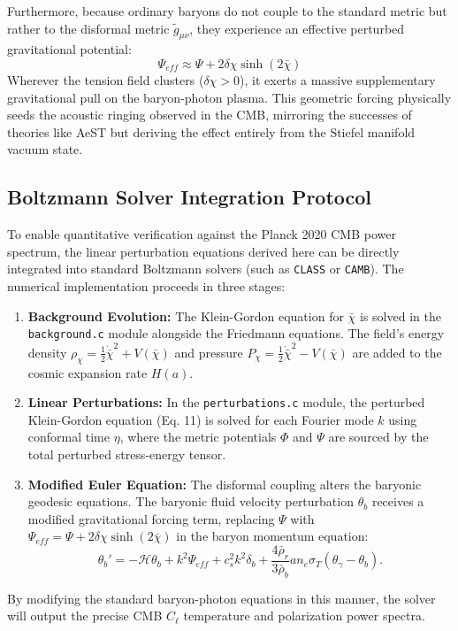 \documentclass[twocolumn,amsmath,amssymb,floatfix]{article}
\newcommand{\tmunu}{\tilde{g}_{\mu\nu}}
\begin{document}
Furthermore, because ordinary baryons do not couple to the standard metric but rather to the disformal metric $\tmunu$, they experience an effective perturbed gravitational potential:
\begin{equation}
    \Psi_{eff} \approx \Psi + 2\delta\chi \sinh(2\bar{\chi})
\end{equation}
Wherever the tension field clusters ($\delta\chi > 0$), it exerts a massive supplementary gravitational pull on the baryon-photon plasma. This geometric forcing physically seeds the acoustic ringing observed in the CMB, mirroring the successes of theories like AeST \citep{Skordis2021} but deriving the effect entirely from the Stiefel manifold vacuum state.

\subsection{Boltzmann Solver Integration Protocol}

To enable quantitative verification against the Planck 2020 CMB power spectrum, the linear perturbation equations derived here can be directly integrated into standard Boltzmann solvers (such as \texttt{CLASS} or \texttt{CAMB}). The numerical implementation proceeds in three stages:
\begin{enumerate}
    \item \textbf{Background Evolution:} The Klein-Gordon equation for $\bar{\chi}$ is solved in the \texttt{background.c} module alongside the Friedmann equations. The field's energy density $\rho_\chi = \frac{1}{2} \dot{\bar{\chi}}^2 + V(\bar{\chi})$ and pressure $P_\chi = \frac{1}{2} \dot{\bar{\chi}}^2 - V(\bar{\chi})$ are added to the cosmic expansion rate $H(a)$.
    \item \textbf{Linear Perturbations:} In the \texttt{perturbations.c} module, the perturbed Klein-Gordon equation (Eq. 11) is solved for each Fourier mode $k$ using conformal time $\eta$, where the metric potentials $\Phi$ and $\Psi$ are sourced by the total perturbed stress-energy tensor.
    \item \textbf{Modified Euler Equation:} The disformal coupling alters the baryonic geodesic equations. The baryonic fluid velocity perturbation $\theta_b$ receives a modified gravitational forcing term, replacing $\Psi$ with $\Psi_{eff} = \Psi + 2\delta\chi \sinh(2\bar{\chi})$ in the baryon momentum equation:
    \begin{equation}
        \theta_b' = -\mathcal{H}\theta_b + k^2 \Psi_{eff} + c_s^2 k^2 \delta_b + \frac{4\bar{\rho}_r}{3\bar{\rho}_b} a n_e \sigma_T (\theta_\gamma - \theta_b).
    \end{equation}
\end{enumerate}
By modifying the standard baryon-photon equations in this manner, the solver will output the precise CMB $C_\ell$ temperature and polarization power spectra.
\end{document}
